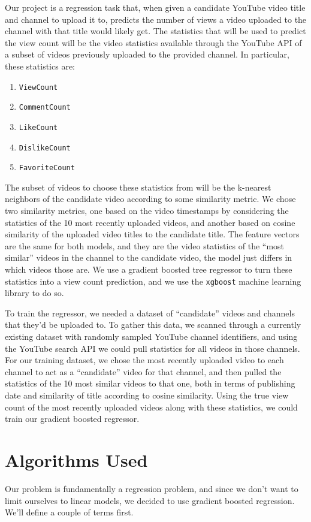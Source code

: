 \documentclass[12pt]{article}
\theoremstyle{definition}
\theoremstyle{remark}
\begin{document}
Our project is a regression task that, when given a candidate YouTube
video title and channel to upload it to, predicts the number of views a video
uploaded to the channel with that title would likely get. The statistics that
will be used to predict the view count will be the video statistics available
through the YouTube API of a subset of videos previously uploaded to the
provided channel. In particular, these statistics are:
\begin{enumerate}
  \item \texttt{ViewCount}
  \item \texttt{CommentCount}
  \item \texttt{LikeCount}
  \item \texttt{DislikeCount}
  \item \texttt{FavoriteCount}
  \end{enumerate}
The subset of videos to choose these statistics from will be the k-nearest
neighbors of the candidate video according to some similarity metric.
We chose two similarity metrics, one based on the video timestamps by considering
the statistics of the 10 most recently uploaded videos, and another based on
cosine similarity of the uploaded video titles to the candidate title.
The feature vectors are the same for both
models, and they are the video statistics of the ``most similar'' videos in the
channel to the candidate video, the model just differs in which videos those are.
We use a gradient boosted tree regressor to turn these statistics into a view
count prediction, and we use the \texttt{xgboost} machine learning library to do
so.

To train the regressor, we needed a dataset of ``candidate'' videos and
channels that they'd be uploaded to. To gather this data, we scanned through a
currently existing dataset with randomly sampled YouTube channel identifiers,
and using the YouTube search API we could pull statistics for all videos in
those channels. For our training dataset, we chose the most recently
uploaded video to each channel to act as a ``candidate'' video for that channel,
and then pulled the statistics of the 10 most similar videos to that one, both
in terms of publishing date and similarity of title according to cosine similarity.
Using the true view count of the most recently uploaded videos along with these
statistics, we could train our gradient boosted regressor.

\section{Algorithms Used}
Our problem is fundamentally a regression problem, and since we don't want to
limit ourselves to linear models, we decided to use gradient boosted regression.
We'll define a couple of terms first.
\end{document}
